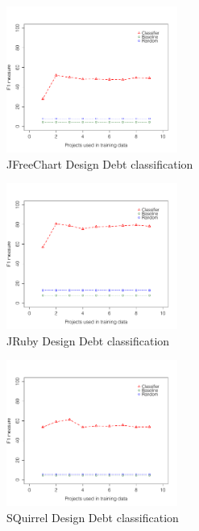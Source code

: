 \begin{figure}[thb!]
  \centering
  \includegraphics[width=0.50\textwidth]{figures/design_jfreechart.pdf}
  \vspace{-3mm}
  \caption{JFreeChart Design Debt classification}
  \label{fig:design_jfreechart}
\end{figure}

\begin{figure}[thb!]
  \centering
  \includegraphics[width=0.50\textwidth]{figures/design_jruby.pdf}
  \vspace{-3mm}
  \caption{JRuby Design Debt classification}
  \label{fig:design_jruby}
\end{figure}

\begin{figure}[thb!]
  \centering
  \includegraphics[width=0.50\textwidth]{figures/design_sql.pdf}
  \vspace{-3mm}
  \caption{SQuirrel Design Debt classification}
  \label{fig:design_sql}
\end{figure}

